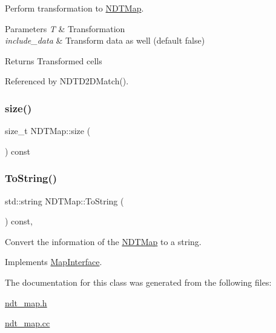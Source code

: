 Perform transformation to \hyperlink{classNDTMap}{N\+D\+T\+Map}. 


\begin{DoxyParams}{Parameters}
{\em T} & Transformation \\
\hline
{\em include\+\_\+data} & Transform data as well (default false) \\
\hline
\end{DoxyParams}
\begin{DoxyReturn}{Returns}
Transformed cells 
\end{DoxyReturn}


Referenced by N\+D\+T\+D2\+D\+Match().

\mbox{\label{classNDTMap_aa9e3541e2f4c56ea43d598aef43e5503}} 
\subsubsection{\texorpdfstring{size()}{size()}}
{\footnotesize\ttfamily size\+\_\+t N\+D\+T\+Map\+::size (\begin{DoxyParamCaption}{ }\end{DoxyParamCaption}) const\hspace{0.3cm}{\ttfamily [inline]}}

\mbox{\label{classNDTMap_a355a32d48208aa5bcc361b4be1d6320c}} 
\subsubsection{\texorpdfstring{To\+String()}{ToString()}}
{\footnotesize\ttfamily std\+::string N\+D\+T\+Map\+::\+To\+String (\begin{DoxyParamCaption}{ }\end{DoxyParamCaption}) const\hspace{0.3cm}{\ttfamily [override]}, {\ttfamily [virtual]}}



Convert the information of the \hyperlink{classNDTMap}{N\+D\+T\+Map} to a string. 



Implements \hyperlink{classMapInterface_a87b132e1a619eb21e0ac684fc25f8c74}{Map\+Interface}.



The documentation for this class was generated from the following files\+:\begin{DoxyCompactItemize}
\item 
\hyperlink{ndt__map_8h}{ndt\+\_\+map.\+h}\item 
\hyperlink{ndt__map_8cc}{ndt\+\_\+map.\+cc}\end{DoxyCompactItemize}
